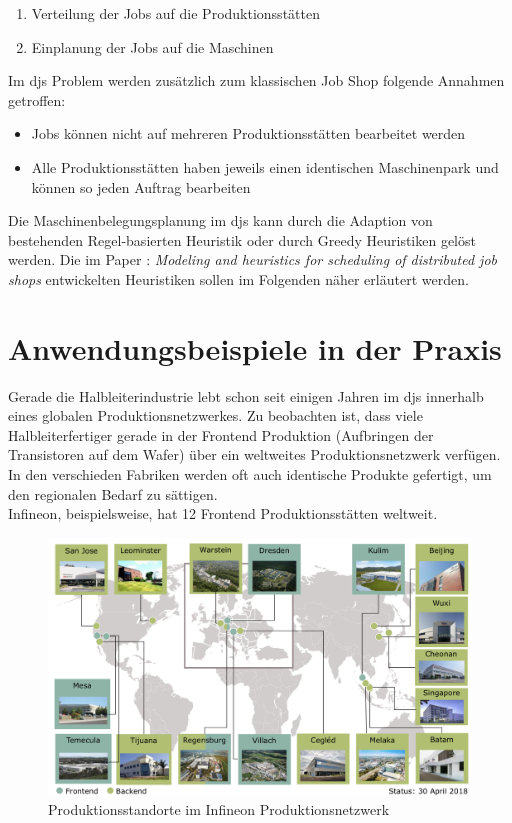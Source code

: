 \documentclass[final, english, ngerman, a4paper, 12pt, %
numbers=noenddot,
cd=true,
cdfont=false,cdfont=nohead,cdfont=nodin,
cdmath=false,
cdhead=false,
cdfoot=true,
cdcover=monochrome,
cdgeometry=symmetric,
declaration=heading,
declaration=notoc,
abstract=heading,
]{tudscrreprt}
\begin{document}
\begin{enumerate}
	\item Verteilung der Jobs auf die Produktionsstätten 
	\item Einplanung der Jobs auf die Maschinen
\end{enumerate}

\noindent
Im \gls{djs} Problem werden zusätzlich zum klassischen Job Shop folgende Annahmen getroffen:

\begin{itemize}
	\item Jobs können nicht auf mehreren Produktionsstätten bearbeitet werden
	\item Alle Produktionsstätten haben jeweils einen identischen Maschinenpark und können so jeden Auftrag bearbeiten
\end{itemize}

\noindent
Die Maschinenbelegungsplanung im \gls{djs} kann durch die Adaption von bestehenden Regel-basierten Heuristik oder durch Greedy Heuristiken gelöst werden. Die im Paper \cite{djs-modeling}: \textit{Modeling and heuristics for scheduling of distributed job shops} entwickelten Heuristiken sollen im Folgenden näher erläutert werden.

\chapter{Anwendungsbeispiele in der Praxis}

Gerade die Halbleiterindustrie lebt schon seit einigen Jahren im \gls{djs} innerhalb eines globalen Produktionsnetzwerkes. Zu beobachten ist, dass viele Halbleiterfertiger gerade in der Frontend Produktion (Aufbringen der Transistoren auf dem Wafer) über ein weltweites Produktionsnetzwerk verfügen. In den verschieden Fabriken werden oft auch identische Produkte gefertigt, um den regionalen Bedarf zu sättigen. \\

\noindent
Infineon, beispielsweise, hat 12 Frontend Produktionsstätten weltweit.
\begin{figure}[h]
	\centering
	\includegraphics[width=\textwidth]{./settings/infineon}
	\caption[Produktionsstandorte im Infineon Produktionsnetzwerk]{Produktionsstandorte im Infineon Produktionsnetzwerk\footnotemark}\label{fig:ifx}
\end{figure}
\end{document}
